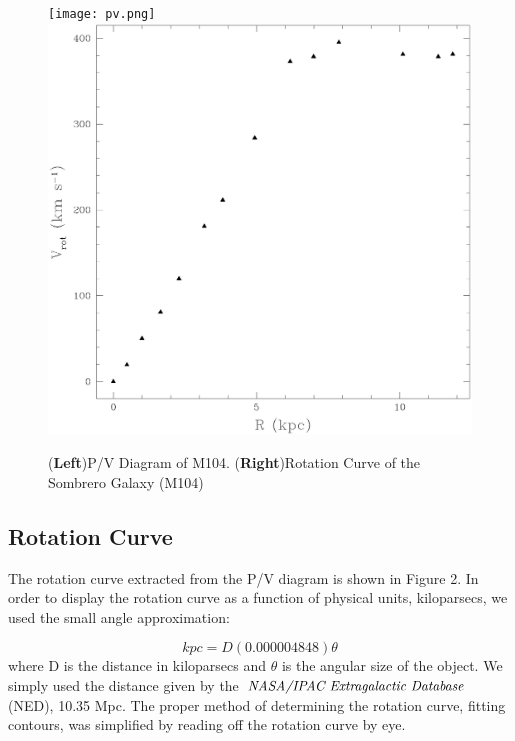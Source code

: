 \documentclass[12pt]{article}
\begin{document}
\begin{figure}
\begin{center}
\texttt{[image: pv.png]}
\includegraphics[scale=0.3]{rotcrv.eps}
\caption{(\textbf{Left})P/V Diagram of M104. (\textbf{Right})Rotation Curve of the Sombrero Galaxy (M104)}
\end{center}
\end{figure}



\subsection{Rotation Curve}

The rotation curve extracted from the P/V diagram is shown in Figure
2. In order to display the rotation curve as a function of physical
units, kiloparsecs, we used the small angle approximation:

\begin{equation}
kpc = D(0.000004848)\theta
\end{equation}
where D is the distance in kiloparsecs and $\theta$ is the angular size
of the object. We simply used the distance given by the $\emph{NASA/IPAC
Extragalactic Database}$ (NED), 10.35 Mpc. The proper method of
determining the rotation curve, fitting contours, was simplified by
reading off the rotation curve by eye.
\end{document}
